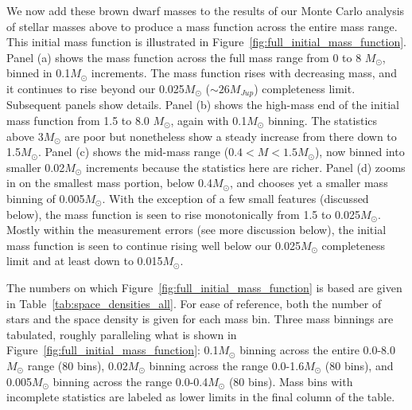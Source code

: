 \documentclass[twocolumn,tighten,twocolappendix]{aastex631}
\begin{document}
We now add these brown dwarf masses to the results of our Monte Carlo analysis of stellar masses above to produce a mass function across the entire mass range. This initial mass function is illustrated in Figure~\ref{fig:full_initial_mass_function}. Panel (a) shows the mass function across the full mass range from 0 to 8 $M_\odot$, binned in 0.1$M_\odot$ increments. The mass function rises with decreasing mass, and it continues to rise beyond our 0.025$M_\odot$ ($\sim26M_{Jup}$) completeness limit. Subsequent panels show details. Panel (b) shows the high-mass end of the initial mass function from 1.5 to 8.0 $M_\odot$, again with 0.1$M_\odot$ binning. The statistics above 3$M_\odot$ are poor but nonetheless show a steady increase from there down to 1.5$M_\odot$. Panel (c) shows the mid-mass range ($0.4 < M < 1.5 M_\odot$), now binned into smaller 0.02$M_\odot$ increments because the statistics here are richer.  Panel (d) zooms in on the smallest mass portion, below 0.4$M_\odot$, and chooses yet a smaller mass binning  of 0.005$M_\odot$. With the exception of a few small features (discussed below), the mass function is seen to rise monotonically from 1.5 to 0.025$M_\odot$. Mostly within the measurement errors (see more discussion below), the initial mass function is seen to continue rising well below our 0.025$M_\odot$ completeness limit and at least down to 0.015$M_\odot$.

The numbers on which Figure~\ref{fig:full_initial_mass_function} is based are given in Table~\ref{tab:space_densities_all}. For ease of reference, both the number of stars and the space density is given for each mass bin. Three mass binnings are tabulated, roughly paralleling what is shown in Figure~\ref{fig:full_initial_mass_function}: 0.1$M_\odot$ binning across the entire 0.0-8.0$M_\odot$ range (80 bins), 0.02$M_\odot$ binning across the range 0.0-1.6$M_\odot$ (80 bins), and 0.005$M_\odot$ binning across the range 0.0-0.4$M_\odot$ (80 bins). Mass bins with incomplete statistics are labeled as lower limits in the final column of the table.
\end{document}
